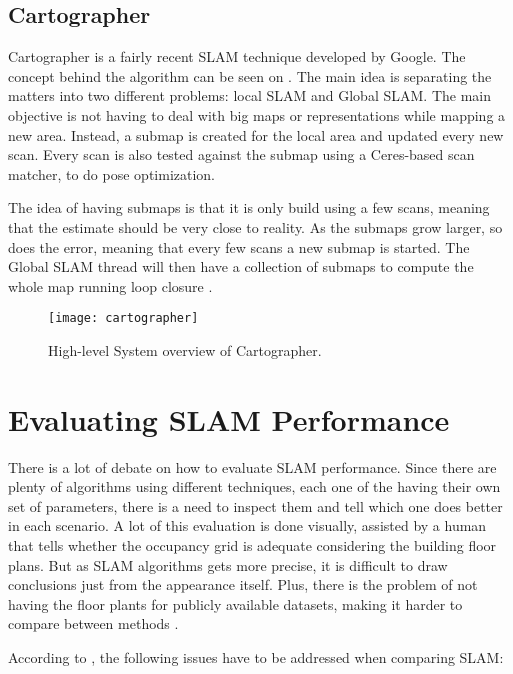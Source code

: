 \subsection{Cartographer}

Cartographer is a fairly recent SLAM technique developed by Google. The concept behind the algorithm can be seen on . The main idea is separating the matters into two different problems: local SLAM and Global SLAM. The main objective is not having to deal with big maps or representations while mapping a new area. Instead, a submap is created for the local area and updated every new scan. Every scan is also tested against the submap using a Ceres-based scan matcher, to do pose optimization.

The idea of having submaps is that it is only build using a few scans, meaning that the estimate should be very close to reality. As the submaps grow larger, so does the error, meaning that every few scans a new submap is started. The Global SLAM thread will then have a collection of submaps to compute the whole map running loop closure \cite{cartographer2016google}.

\begin{figure}[!ht]
    \centering
    \texttt{[image: cartographer]}
    \caption{High-level System overview of Cartographer.}
    \label{fig:cartographer}
\end{figure}

\section{Evaluating SLAM Performance}

There is a lot of debate on how to evaluate SLAM performance. Since there are plenty of algorithms using different techniques, each one of the having their own set of parameters, there is a need to inspect them and tell which one does better in each scenario. A lot of this evaluation is done visually, assisted by a human that tells whether the occupancy grid is adequate considering the building floor plans. But as SLAM algorithms gets more precise, it is difficult to draw conclusions just from the appearance itself. Plus, there is the problem of not having the floor plants for publicly available datasets, making it harder to compare between methods \cite{kummerle2009measuring}.

According to \citeauthor{amigoni2007good}, the following issues have to be addressed when comparing SLAM:

